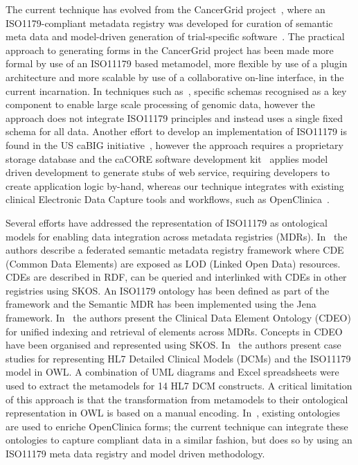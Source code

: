 The current technique has evolved from the CancerGrid project~\cite{davi14}, where an ISO1179-compliant metadata registry was developed for curation of semantic meta data and model-driven generation of trial-specific software~\cite{davi12, Abler2011}. The practical approach to generating forms in the CancerGrid project has been made more formal by use of an ISO11179 based metamodel, more flexible by use of a plugin architecture and more scalable by use of a collaborative on-line interface, in the current incarnation. In techniques such as~\cite{mass13}, specific schemas recognised as a key component to enable large scale processing of genomic data, however the approach does not integrate ISO11179 principles and instead uses a single fixed schema for all data. Another effort to develop an implementation of ISO11179 is found in the US caBIG initiative~\cite{kunz09}, however the approach requires a proprietary storage database and the caCORE software development kit~\cite{koma08} applies model driven development to generate stubs of web service, requiring developers to create application logic by-hand, whereas our technique integrates with existing clinical Electronic Data Capture tools and workflows, such as OpenClinica~\cite{oc}. 



Several efforts have addressed the representation of ISO11179 as
ontological models for enabling data integration across metadata
registries (MDRs). In~\cite{Sinaci2013784} the authors describe a
federated semantic metadata registry framework where CDE (Common Data
Elements) are exposed as LOD (Linked Open Data) resources. CDEs are
described in RDF, can be queried and interlinked with CDEs in other
registries using SKOS. An ISO1179 ontology has been defined as part of
the framework and the Semantic MDR has been implemented using the Jena
framework. In~\cite{pmid25405066} the authors present the Clinical
Data Element Ontology (CDEO) for unified indexing and retrieval of
elements across MDRs. Concepts in CDEO have been organised and
represented using SKOS. In~\cite{pmid22211181} the authors present
case studies for representing HL7 Detailed Clinical Models (DCMs) and
the ISO11179 model in OWL. A combination of UML diagrams and Excel
spreadsheets were used to extract the metamodels for 14 HL7 DCM
constructs. A critical limitation of this approach is that the
transformation from metamodels to their ontological representation in
OWL is based on a manual encoding. In~\cite{lero12}, existing ontologies are used to enriche OpenClinica forms; the current technique can integrate these ontologies to capture compliant data in a similar fashion, but does so by using an ISO11179 meta data registry and model driven methodology.

